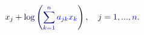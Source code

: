 \documentclass[12pt]{article}
\begin{document}
\makeatletter
\renewcommand*{\@textcolor}[3]{%
  \protect\leavevmode
  \begingroup
    \color#1{#2}#3%
  \endgroup
}
\makeatother
\begin{displaymath}
\mathcolor[RGB]{0,0,15}{x} _ { \mathcolor[RGB]{0,0,30}{j} } \mathcolor[RGB]{0,0,45}{+} \mathrm { \mathcolor[RGB]{0,0,60}{l} \mathcolor[RGB]{0,0,75}{o} \mathcolor[RGB]{0,0,90}{g} } \mathcolor[RGB]{0,0,105}{\left(} \mathcolor[RGB]{0,0,120}{\sum} _ { \mathcolor[RGB]{0,0,135}{k} \mathcolor[RGB]{0,0,150}{=} \mathcolor[RGB]{0,0,165}{1} } ^ { \mathcolor[RGB]{0,0,180}{n} } \mathcolor[RGB]{0,0,195}{a} _ { \mathcolor[RGB]{0,0,210}{j} \mathcolor[RGB]{0,0,225}{k} } \mathcolor[RGB]{0,0,240}{x} _ { \mathcolor[RGB]{0,0,255}{k} } \mathcolor[RGB]{0,15,0}{\right)} \mathcolor[RGB]{0,15,15}{,} \quad \mathcolor[RGB]{0,15,30}{j} \mathcolor[RGB]{0,15,45}{=} \mathcolor[RGB]{0,15,60}{1} \mathcolor[RGB]{0,15,75}{,} \mathcolor[RGB]{0,15,90}{.} \mathcolor[RGB]{0,15,105}{.} \mathcolor[RGB]{0,15,120}{.} \mathcolor[RGB]{0,15,135}{,} \mathcolor[RGB]{0,15,150}{n} \mathcolor[RGB]{0,15,165}{.}
\end{displaymath}
\end{document}

